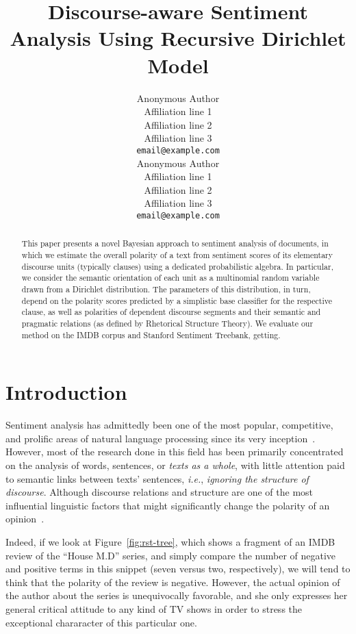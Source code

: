 \documentclass[11pt]{article}
\title{Discourse-aware Sentiment Analysis Using Recursive Dirichlet
  Model}
\author{Anonymous Author\\
  Affiliation line 1 \\
  Affiliation line 2 \\
  Affiliation line 3 \\
  {\tt email@example.com} \\\And{}
  Anonymous Author\\
  Affiliation line 1 \\
  Affiliation line 2 \\
  Affiliation line 3 \\
  {\tt email@example.com} \\}
\date{}
\newcommand{\ienocomma}{\textit{i.e.}}
\newcommand{\ie}{\ienocomma,}
\begin{document}
\maketitle
\begin{abstract}
  This paper presents a novel Bayesian approach to sentiment analysis
  of documents, in which we estimate the overall polarity of a text
  from sentiment scores of its elementary discourse units (typically
  clauses) using a dedicated probabilistic algebra.  In particular, we
  consider the semantic orientation of each unit as a multinomial
  random variable drawn from a Dirichlet distribution.  The parameters
  of this distribution, in turn, depend on the polarity scores
  predicted by a simplistic base classifier for the respective clause,
  as well as polarities of dependent discourse segments and their
  semantic and pragmatic relations (as defined by Rhetorical Structure
  Theory).  We evaluate our method on the IMDB corpus and Stanford
  Sentiment Treebank, getting.
\end{abstract}

\section{Introduction}\label{intro}

Sentiment analysis has admittedly been one of the most popular,
competitive, and prolific areas of natural language processing since
its very inception~\cite[pp.~]{Liu:12}.  However, most
of the research done in this field has been primarily concentrated on
the analysis of words, sentences, or \emph{texts as a whole}, with
little attention paid to semantic links between texts' sentences,
\ie{} \emph{ignoring the structure of discourse}.  Although discourse
relations and structure are one of the most influential linguistic
factors that might significantly change the polarity of an
opinion~\cite{Polanyi:06}.

Indeed, if we look at Figure~\ref{fig:rst-tree}, which shows a
fragment of an IMDB review of the ``House M.D'' series, and simply
compare the number of negative and positive terms in this snippet
(seven versus two, respectively), we will tend to think that the
polarity of the review is negative.  However, the actual opinion of
the author about the series is unequivocally favorable, and she only
expresses her general critical attitude to any kind of TV shows in
order to stress the exceptional chararacter of this particular one.
\end{document}
